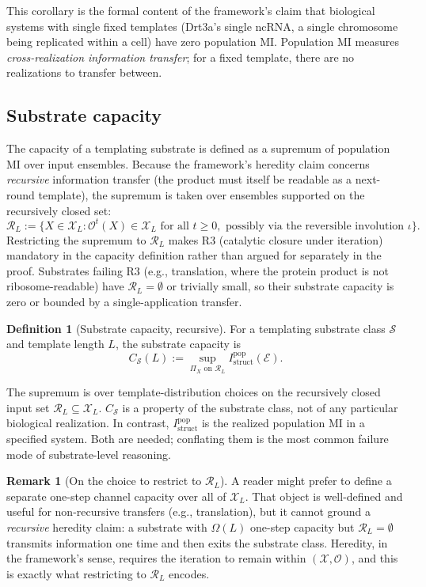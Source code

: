 \documentclass[11pt]{article}
\theoremstyle{plain}
\theoremstyle{definition}
\newtheorem{definition}[theorem]{Definition}
\newtheorem{remark}[theorem]{Remark}
\newcommand{\Istructpop}{I_{\mathrm{struct}}^{\mathrm{pop}}}
\newcommand{\Csub}{C_{\mathcal{S}}}
\newcommand{\Op}{\mathcal{O}}
\begin{document}
This corollary is the formal content of the framework's claim that biological systems with single fixed templates (Drt3a's single ncRNA, a single chromosome being replicated within a cell) have zero population MI. Population MI measures \emph{cross-realization information transfer}; for a fixed template, there are no realizations to transfer between.

\subsection{Substrate capacity}

The capacity of a templating substrate is defined as a supremum of population MI over input ensembles. Because the framework's heredity claim concerns \emph{recursive} information transfer (the product must itself be readable as a next-round template), the supremum is taken over ensembles supported on the recursively closed set:
\[
\mathcal{R}_L := \{X \in \mathcal{X}_L : \Op^t(X) \in \mathcal{X}_L \text{ for all } t \ge 0, \text{ possibly via the reversible involution } \iota\}.
\]
Restricting the supremum to $\mathcal{R}_L$ makes R3 (catalytic closure under iteration) mandatory in the capacity definition rather than argued for separately in the proof. Substrates failing R3 (e.g., translation, where the protein product is not ribosome-readable) have $\mathcal{R}_L = \emptyset$ or trivially small, so their substrate capacity is zero or bounded by a single-application transfer.

\begin{definition}[Substrate capacity, recursive]
\label{def:capacity}
For a templating substrate class $\mathcal{S}$ and template length $L$, the substrate capacity is
\[
\Csub(L) := \sup_{\Pi_X \text{ on } \mathcal{R}_L} \Istructpop(\mathcal{E}).
\]
\end{definition}

The supremum is over template-distribution choices on the recursively closed input set $\mathcal{R}_L \subseteq \mathcal{X}_L$. $\Csub$ is a property of the substrate class, not of any particular biological realization. In contrast, $\Istructpop$ is the realized population MI in a specified system. Both are needed; conflating them is the most common failure mode of substrate-level reasoning.

\begin{remark}[On the choice to restrict to $\mathcal{R}_L$]
\label{rem:recursive_restriction}
A reader might prefer to define a separate one-step channel capacity over all of $\mathcal{X}_L$. That object is well-defined and useful for non-recursive transfers (e.g., translation), but it cannot ground a \emph{recursive} heredity claim: a substrate with $\Omega(L)$ one-step capacity but $\mathcal{R}_L = \emptyset$ transmits information one time and then exits the substrate class. Heredity, in the framework's sense, requires the iteration to remain within $(\mathcal{X}, \Op)$, and this is exactly what restricting to $\mathcal{R}_L$ encodes.
\end{remark}
\end{document}
